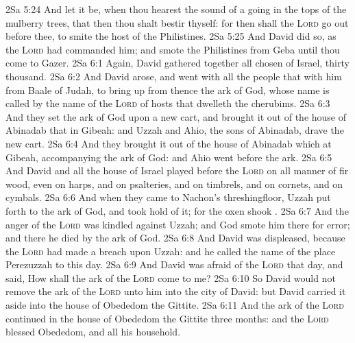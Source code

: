 \vs 2Sa 5:24 And let it be, when thou hearest the sound of a going in the tops of the mulberry trees, that then thou shalt bestir thyself: for then shall the \textsc{Lord} go out before thee, to smite the host of the Philistines.
\vs 2Sa 5:25 And David did so, as the \textsc{Lord} had commanded him; and smote the Philistines from Geba until thou come to Gazer.
\vs 2Sa 6:1 Again, David gathered together all  chosen  of Israel, thirty thousand.
\vs 2Sa 6:2 And David arose, and went with all the people that  with him from Baale of Judah, to bring up from thence the ark of God, whose name is called by the name of the \textsc{Lord} of hosts that dwelleth  the cherubims.
\vs 2Sa 6:3 And they set the ark of God upon a new cart, and brought it out of the house of Abinadab that  in Gibeah: and Uzzah and Ahio, the sons of Abinadab, drave the new cart.
\vs 2Sa 6:4 And they brought it out of the house of Abinadab which  at Gibeah, accompanying the ark of God: and Ahio went before the ark.
\vs 2Sa 6:5 And David and all the house of Israel played before the \textsc{Lord} on all manner of  fir wood, even on harps, and on psalteries, and on timbrels, and on cornets, and on cymbals.
\vs 2Sa 6:6 And when they came to Nachon's threshingfloor, Uzzah put forth  to the ark of God, and took hold of it; for the oxen shook .
\vs 2Sa 6:7 And the anger of the \textsc{Lord} was kindled against Uzzah; and God smote him there for  error; and there he died by the ark of God.
\vs 2Sa 6:8 And David was displeased, because the \textsc{Lord} had made a breach upon Uzzah: and he called the name of the place Perezuzzah to this day.
\vs 2Sa 6:9 And David was afraid of the \textsc{Lord} that day, and said, How shall the ark of the \textsc{Lord} come to me?
\vs 2Sa 6:10 So David would not remove the ark of the \textsc{Lord} unto him into the city of David: but David carried it aside into the house of Obededom the Gittite.
\vs 2Sa 6:11 And the ark of the \textsc{Lord} continued in the house of Obededom the Gittite three months: and the \textsc{Lord} blessed Obededom, and all his household.
